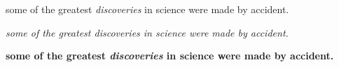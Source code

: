 
 some of the greatest \emph{discoveries} 
in science 
were made by accident.

\textit{some of the greatest \emph{discoveries} 
in science 
were made by accident.}

\textbf{some of the greatest \emph{discoveries} 
in science 
were made by accident.}

